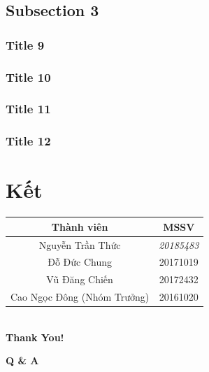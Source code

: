 \documentclass[10pt]{beamer}
\begin{document}
\subsection{Subsection 3}
\begin{frame}
\transsplitverticalout
\frametitle{Title 9}

\end{frame}

\begin{frame}
\transblindshorizontal
\frametitle{Title 10}

\end{frame}

\begin{frame}
\transsplitverticalin
\frametitle{Title 11}

\end{frame}

\begin{frame}
\transsplitverticalout
\frametitle{Title 12}

\end{frame}






    
\section*{Kết}
\begin{frame}
\transsplitverticalin
\centering
\begin{tabular}{|c||c|}
\hline 
\textbf{Thành viên} & \textbf{MSSV} \\ 
\hline 
Nguyễn Trần Thức  & \textit{20185483} \\ 
\hline 
Đỗ Đức Chung & 20171019 \\ 
\hline 
Vũ Đăng Chiến  & 20172432 \\ 
\hline 
Cao Ngọc Đông 
(Nhóm Trưởng)
 & 20161020 \\ 
\hline 
\end{tabular}
\\
\centering
{\fontsize{40}{50} \textcolor{redd}{\textbf{Thank You!}}}

\hyperlink{contents}{}
\end{frame}

\begin{frame}
\transsplitverticalout
\centering
{\fontsize{40}{50} \textcolor{redd}{\textbf{Q \& A}}}
\end{frame}
\end{document}
